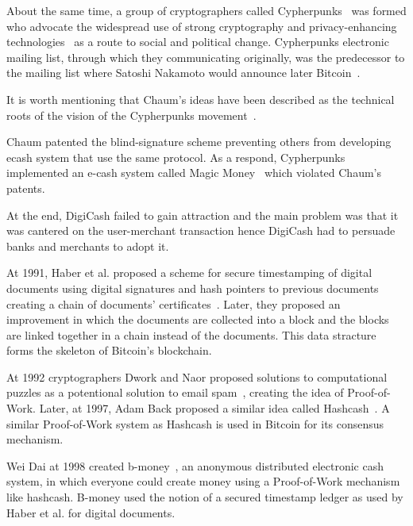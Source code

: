 About the same time, a group of cryptographers called Cypherpunks~\cite{cypherpunk,cypherpunks_manifesto} was formed who advocate the widespread
use of strong cryptography and privacy-enhancing technologies~\cite{cypherpunks_manifesto} as a route to social and political change. Cypherpunks electronic mailing list,
through which they communicating originally, was the predecessor to the mailing list where Satoshi Nakamoto would announce later Bitcoin~\cite{nakamoto2012bitcoin}.

It is worth mentioning that Chaum's ideas have been described as the technical roots of the vision of the Cypherpunks movement~\cite{cypherpunk}.

Chaum patented the blind-signature scheme preventing others from developing ecash system that use the same protocol. As a respond,
Cypherpunks implemented an e-cash system called Magic Money~\cite{magic_money} which violated Chaum's patents.

At the end, DigiCash failed to gain attraction and the main problem was that it was cantered on the user-merchant transaction hence
DigiCash had to persuade banks and merchants to adopt it.

At 1991, Haber et al. proposed a scheme for secure timestamping of digital documents using digital signatures and hash pointers to previous documents
creating a chain of documents' certificates~\cite{Haber1991}. Later, they proposed an improvement in which the documents are collected into a block and
the blocks are linked together in a chain instead of the documents. This data stracture forms the skeleton of Bitcoin's blockchain.

At 1992 cryptographers Dwork and Naor proposed solutions to computational puzzles as a potentional solution to email spam~\cite{Dwork1993},
creating the idea of Proof-of-Work. Later, at 1997, Adam Back proposed a similar idea called Hashcash~\cite{hash_cash}.
A similar Proof-of-Work system as Hashcash is used in Bitcoin for its consensus mechanism.

Wei Dai at 1998 created b-money~\cite{b_money}, an anonymous distributed electronic cash system, in which everyone
could create money using a Proof-of-Work mechanism like hashcash. B-money used the notion of a secured timestamp ledger as used by Haber et al. for digital documents.

